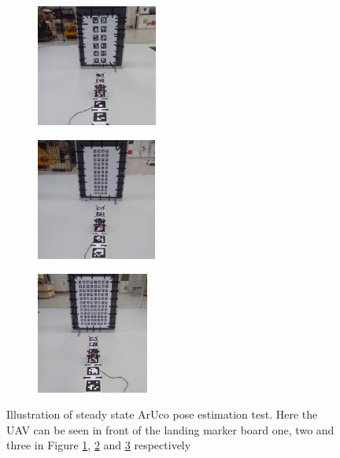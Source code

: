 \documentclass[../Head/report.tex]{subfiles}
\begin{document}
\begin{figure}[H]
    \centering
    \begin{subfigure}[t]{.25\textwidth}
        \centering
        \includegraphics[height=4.0cm]{../Figures/optitrack/steady_state_pose_estimation_one.png}
        \caption{}
        \label{fig:steady_state_aruco_pose_estimation_board_one}
    \end{subfigure}
    \begin{subfigure}[t]{.25\textwidth}
        \centering
        \includegraphics[height=4.0cm]{../Figures/optitrack/steady_state_pose_estimation_two.png}
        \caption{}
        \label{fig:steady_state_aruco_pose_estimation_board_two}
    \end{subfigure}
    \begin{subfigure}[t]{.25\textwidth}
        \centering
        \includegraphics[height=4.0cm]{../Figures/optitrack/steady_state_pose_estimation_three.png}
        \caption{}
        \label{fig:steady_state_aruco_pose_estimation_board_three}
    \end{subfigure}
    \caption{Illustration of steady state ArUco pose estimation test. Here the UAV can be seen in front of the landing marker board one, two and three in Figure \ref{fig:steady_state_aruco_pose_estimation_board_one}, \ref{fig:steady_state_aruco_pose_estimation_board_two} and \ref{fig:steady_state_aruco_pose_estimation_board_three} respectively}
    \hspace{-5.5em} 
    \label{fig:steady_state_aruco_pose_estimation_boards}
\end{figure}
\end{document}
